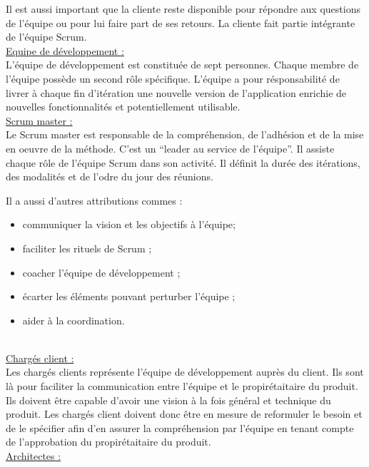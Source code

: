 \documentclass{../res/univ-projet}
\begin{document}
Il est aussi important que la cliente reste disponible pour répondre aux questions de l'équipe ou pour lui faire part de ses retours. La cliente fait partie intégrante 
de l'équipe Scrum. \\

\underline{Equipe de développement :} \\

L'équipe de développement est constituée de sept personnes. Chaque membre de l'équipe possède un second rôle spécifique. L'équipe a pour résponsabilité de livrer à 
chaque fin d'itération une nouvelle version de l'application enrichie de nouvelles fonctionnalités et potentiellement utilisable. \\

\underline{Scrum master :} \\

Le Scrum master est responsable de la compréhension, de l'adhésion et de la mise en oeuvre de la méthode. C'est un ``leader au service de l'équipe''. Il assiste chaque 
rôle de l'équipe Scrum dans son activité. Il définit la durée des itérations, des modalités et de l'odre du jour des réunions.

Il a aussi d'autres attributions commes :
\begin{itemize}
 \item communiquer la vision et les objectifs à l'équipe;
 \item faciliter les rituels de Scrum ;
 \item coacher l'équipe de développement ;
 \item écarter les éléments pouvant perturber l'équipe ;
 \item aider à la coordination.
\end{itemize} ~\\

\underline{Chargés client :} \\

Les chargés clients représente l'équipe de développement auprès du client. Ils sont là pour faciliter la communication entre l'équipe et le propirétaitaire du produit. 
Ils doivent être capable d'avoir une vision à la fois général et technique du produit. Les chargés client doivent donc être en mesure de reformuler le besoin et de le 
spécifier afin d'en assurer la compréhension par l'équipe en tenant compte de l'approbation du propirétaitaire du produit. \\

\underline{Architectes :} \\
\end{document}
